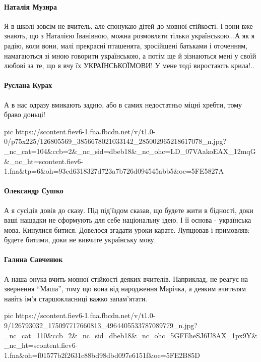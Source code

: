 \paragraph{Наталія Музира}

Я в школі зовсім не вчитель, але спонукаю дітей до мовної стійкості. І вони вже
знають, що з Наталією Іванівною, можна розмовляти тільки українською...А як я
радію, коли вони, малі прекрасні пташенята, зросійщені батьками і оточенням,
намагаються зі мною говорити українською, а потім ще й зізнаються мені у своїй
любові за те, що я вчу їх УКРАЇНСЬКОЇМОВИ! У мене тоді виростають крила!..

\paragraph{Руслана Курах}

А в нас одразу вмикають задню, або в самих недостатньо міцні хребти, тому браво
доньці!

\ifcmt
pic https://scontent.fiev6-1.fna.fbcdn.net/v/t1.0-0/p75x225/126805569_3856678021033142_285002965218617078_n.jpg?_nc_cat=104&ccb=2&_nc_sid=dbeb18&_nc_ohc=LD_07VAakoEAX_12mqG&_nc_ht=scontent.fiev6-1.fna&tp=6&oh=93cd6318327d723a7b726d094545abb5&oe=5FE5827A
\fi

\paragraph{Олександр Сушко}

А я сусідів довів до сказу. Під під'їздом сказав, що будете жити в бідності,
доки ваші нащадки не сформують для себе національну ідею. І її основа -
українська мова. Кинулися битися. Довелося згадати уроки карате. Лупцював і
примовляв: будете битими, доки не вивчите українську мову.

\paragraph{Галина Савченюк}

А наша онука вчить мовної стійкості деяких вчителів. Наприклад, не реагує на
звернення \enquote{Маша}, тому що вона від народження Марічка, а деяким вчителям навіть
ім'я старшокласниці важко запам'ятати.

\ifcmt
pic https://scontent.fiev6-1.fna.fbcdn.net/v/t1.0-9/126793032_175097717660813_4964405533787089779_n.jpg?_nc_cat=110&ccb=2&_nc_sid=dbeb18&_nc_ohc=5GFEheSJ6U8AX_1px9Y&_nc_ht=scontent.fiev6-1.fna&oh=f01577b2f2631c88bd98dbd097e6151f&oe=5FE2B85D
\fi

